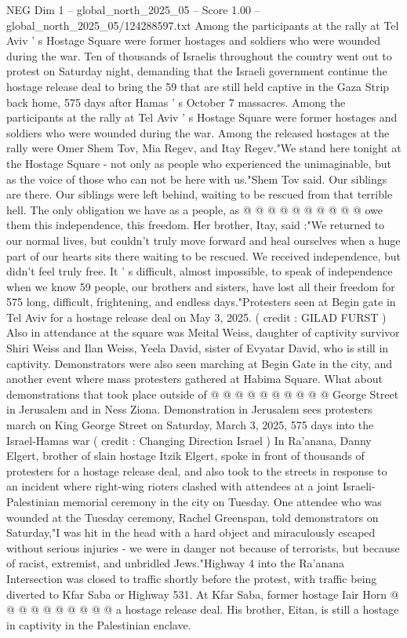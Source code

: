 \begin{textsample}{NEG Dim 1 – global\_north\_2025\_05 – Score 1.00 – global\_north\_2025\_05/124288597.txt}  \label{ex:f1_neg_238}
Among the participants at the rally at Tel Aviv ' s Hostage Square were former hostages and soldiers who were wounded during the war.
Ten of thousands of Israelis throughout the country went out to protest on Saturday night, demanding that the Israeli government continue the hostage release deal to bring the 59 that are still held captive in the Gaza Strip back home, 575 days after Hamas ' s October 7 massacres.
Among the participants at the rally at Tel Aviv ' s Hostage Square were former hostages and soldiers who were wounded during the war.
Among the released hostages at the rally were Omer Shem Tov, Mia Regev, and Itay Regev."We stand here tonight at the Hostage Square - not only as people who experienced the unimaginable, but as the voice of those who can not be here with us."Shem Tov said.
Our siblings are there.
Our siblings were left behind, waiting to be rescued from that terrible hell.
The only obligation we have as a people, as @ @ @ @ @ @ @ @ @ @ owe them this independence, this freedom.
Her brother, Itay, said :"We returned to our normal lives, but couldn't truly move forward and heal ourselves when a huge part of our hearts sits there waiting to be rescued.
We received independence, but didn't feel truly free.
It ' s difficult, almost impossible, to speak of independence when we know 59 people, our brothers and sisters, have lost all their freedom for 575 long, difficult, frightening, and endless days."Protesters seen at Begin gate in Tel Aviv for a hostage release deal on May 3, 2025. ( credit : GILAD FURST ) Also in attendance at the square was Meital Weiss, daughter of captivity survivor Shiri Weiss and Ilan Weiss, Yeela David, sister of Evyatar David, who is still in captivity.
Demonstrators were also seen marching at Begin Gate in the city, and another event where mass protesters gathered at Habima Square.
What about demonstrations that took place outside of @ @ @ @ @ @ @ @ @ @ George Street in Jerusalem and in Ness Ziona.
Demonstration in Jerusalem sees protesters march on King George Street on Saturday, March 3, 2025, 575 days into the Israel-Hamas war ( credit : Changing Direction Israel ) In Ra'anana, Danny Elgert, brother of slain hostage Itzik Elgert, spoke in front of thousands of protesters for a hostage release deal, and also took to the streets in response to an incident where right-wing rioters clashed with attendees at a joint Israeli-Palestinian memorial ceremony in the city on Tuesday.
One attendee who was wounded at the Tuesday ceremony, Rachel Greenspan, told demonstrators on Saturday,"I was hit in the head with a hard object and miraculously escaped without serious injuries - we were in danger not because of terrorists, but because of racist, extremist, and unbridled Jews."Highway 4 into the Ra'anana Intersection was closed to traffic shortly before the protest, with traffic being diverted to Kfar Saba or Highway 531.
At Kfar Saba, former hostage Iair Horn @ @ @ @ @ @ @ @ @ @ a hostage release deal.
His brother, Eitan, is still a hostage in captivity in the Palestinian enclave.

\end{textsample}
